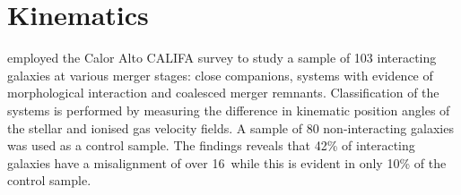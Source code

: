 \section{Kinematics}
\label{sec:kinematics}

\citet{2015A&A...582A..21B} employed the Calor Alto CALIFA survey to study a sample of 103 interacting galaxies at various merger stages: close companions, systems with evidence of morphological interaction and coalesced merger remnants. Classification of the systems is performed by measuring the difference in kinematic position angles of the stellar and ionised gas velocity fields. A sample of 80 non-interacting galaxies was used as a control sample. The findings reveals that 42\% of interacting galaxies have a misalignment of over 16\textdegree\ while this is evident in only 10\% of the control sample.


